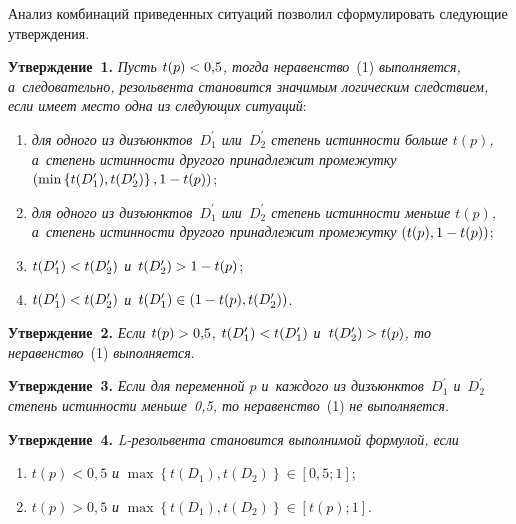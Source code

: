 \begin{multicols}{2}
  Анализ комбинаций приведенных ситуаций поз\-во\-лил сформулировать 
следующие утверж\-де\-ния.
  
  \smallskip
  
  \noindent
  \textbf{Утверждение~1.} \textit{Пусть $t(p)\hm< 0{,}5$, тогда 
неравенство}~(1) \textit{выполняется, а~следовательно, резольвента 
становится значимым логическим следствием, если имеет место одна из 
следующих ситуаций}: 
\begin{enumerate}[(1)]
\item \textit{для одного из дизъюнктов~$D_1^\prime$ 
или~$D_2^\prime$ степень истинности больше $t(p)$, а~степень истинности 
другого принадлежит промежутку} $\left( \min \left\{ t(D_1^\prime), 
t(D_2^\prime)\right\}, 1\hm- t(p)\right)$; 
\item \textit{для одного из 
дизъюнктов~$D_1^\prime$ или~$D_2^\prime$ степень истинности меньше 
$t(p)$, а~степень истинности другого принадлежит промежутку} 
  $\left( t(p), 1\hm- t(p)\right)$;
  \item $t(D_1^\prime) \hm< t(D_2^\prime)$ 
  \textit{и}~$t(D_2^\prime) \hm>1\hm- t(p)$; 
  \item $t(D_1^\prime)\hm< t(D_2^\prime)$ \textit{и}~$t(D_1^\prime) \hm\in \left( 1\hm- t(p), t(D_2^\prime)\right)$.
\end{enumerate}
  
  
  \noindent
  \textbf{Утверждение~2.} \textit{Если $t(p)\hm> 0{,}5$, $t(D_1^\prime) \hm< 
t(D_1^\prime)$ и~$t(D_2^\prime) \hm> t(p)$, то неравенство}~(1) 
\textit{выполняется}.
  
  \smallskip
  
  \noindent
  \textbf{Утверждение~3.} \textit{Если для переменной $p$ и~каждого из 
дизъюнктов~$D_1^\prime$ и~$D_2^\prime$ степень истинности меньше~0,5, 
то неравенство}~(1) \textit{не выполняется}.
  
  \smallskip
  
  \noindent
  \textbf{Утверждение~4.} \textit{L-ре\-золь\-вен\-та становится выполнимой 
формулой, если}
  \begin{enumerate}[(1)]
  \item $t(p)<0{,}5$ \textit{и} $\max \left\{ t(D_1), t(D_2)\right\} \in [0{,}5;1]$;
  \item $t(p)>0{,}5$ \textit{и} $\max \left\{ t(D_1), t(D_2)\right\} \in [t(p);1]$.
  \end{enumerate}
  
  \smallskip
  

\end{multicols}
